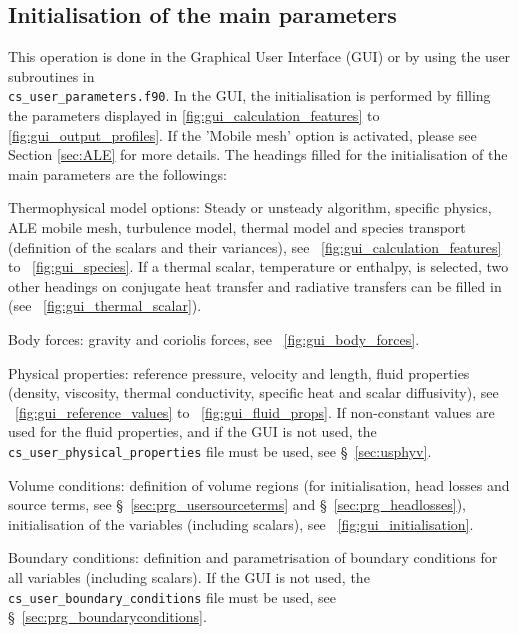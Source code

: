 {{{%
\subsection{Initialisation of the main parameters}

This operation is done in the Graphical User Interface (GUI) or by using the user subroutines in \\ \texttt{cs\_user\_parameters.f90}.
In the GUI, the initialisation is performed by filling the parameters displayed in \figurename\ref{fig:gui_calculation_features}
to \ref{fig:gui_output_profiles}. If the 'Mobile mesh' option is activated,
please see Section \ref{sec:ALE} for more details. The headings filled for the initialisation of the main parameters
are the followings:
\begin{list}{-}{}
\item Thermophysical model options: Steady or unsteady algorithm, specific physics, ALE mobile mesh,
      turbulence model, thermal model and species transport (definition of the scalars and their variances),
see \figurename~\ref{fig:gui_calculation_features} to \figurename~\ref{fig:gui_species}. If a thermal scalar, temperature or enthalpy, is selected,
two other headings on conjugate heat transfer and radiative transfers can be filled in (see \figurename~\ref{fig:gui_thermal_scalar}).
\item Body forces: gravity and coriolis forces, see \figurename~\ref{fig:gui_body_forces}.
\item Physical properties: reference pressure, velocity and length, fluid properties (density, viscosity, thermal conductivity,
specific heat and scalar diffusivity), see \figurename~\ref{fig:gui_reference_values} to \figurename~\ref{fig:gui_fluid_props}.
If non-constant values are used for the fluid properties, and if the GUI is not used, the \\ \texttt{cs\_user\_physical\_properties}
file must be used, see \S~\ref{sec:usphyv}.
\item Volume conditions: definition of volume regions (for initialisation, head losses and source terms,
see \S~\ref{sec:prg_usersourceterms} and \S~\ref{sec:prg_headlosses}), initialisation of the variables (including scalars), see \figurename~\ref{fig:gui_initialisation}.
\item Boundary conditions: definition and parametrisation of boundary conditions for all variables (including scalars).
If the GUI is not used, the \texttt{cs\_user\_boundary\_conditions} file must be used, see \S~\ref{sec:prg_boundaryconditions}.

\end{list}}}}
